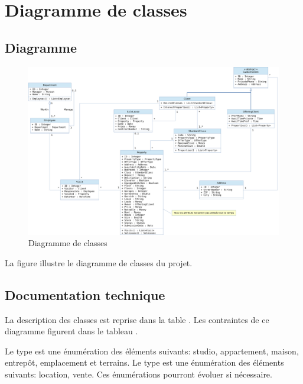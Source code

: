 \chapter{Diagramme de classes}

\section{Diagramme}

\begin{figure}
  \centering
  \includegraphics[angle=90,height=0.99\textheight]{IMG/cd}
  \caption{Diagramme de classes}
  \label{img_cd}
\end{figure}

La figure  illustre le diagramme de classes du projet.

\section{Documentation technique}

La description des classes est reprise dans la table . Les contraintes de ce diagramme figurent dans le tableau .

Le type  est une énumération des éléments suivants: studio, appartement, maison, entrepôt, emplacement et terrains. Le type  est une énumération des éléments suivants: location, vente. Ces énumérations pourront évoluer si nécessaire.

